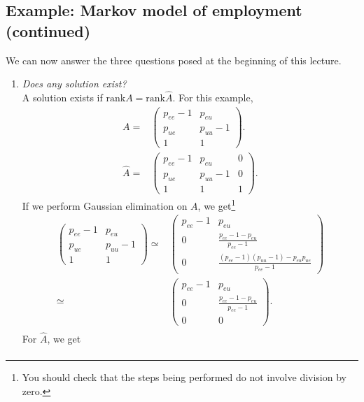 \documentclass[12pt,reqno]{amsart}
\newcommand{\rank}{\mathrm{rank}}
\theoremstyle{definition}
\begin{document}
\subsection*{Example: Markov model of employment (continued)}
We can now answer the three questions posed at the beginning of this
lecture. 
\renewcommand{\theenumi}{\arabic{enumi}}
\begin{enumerate}
\item \emph{Does any solution exist? } \\
  A solution exists if $\rank A = \rank \hat{A}$. For this example, 
  \begin{align*}
    A = & \begin{pmatrix} 
      p_{ee} - 1 & p_{eu}  \\ 
      p_{ue} & p_{uu}-1  \\ 
      1 & 1  \end{pmatrix}.  \\
    \hat{A} = & \begin{pmatrix} 
      p_{ee} - 1 & p_{eu} & 0 \\ 
      p_{ue} & p_{uu}-1 & 0 \\ 
      1 & 1 & 1 \end{pmatrix}. 
  \end{align*}
If we perform Gaussian elimination on $A$, we get\footnote{You should
  check that the steps being performed do not involve division by
  zero.}
\begin{align*}
  \begin{pmatrix} 
    p_{ee} - 1 & p_{eu}  \\ 
    p_{ue} & p_{uu}-1  \\ 
    1 & 1  \end{pmatrix} \simeq & 
  \begin{pmatrix} 
    p_{ee} - 1 & p_{eu}  \\ 
    0 & \frac{p_{ee}- 1 - p_{eu}}{p_{ee}-1}  \\
    0 & \frac{(p_{ee}-1) (p_{uu}- 1) - p_{eu} p_{ue}}{p_{ee}-1} 
  \end{pmatrix} \\
  \simeq &  
  \begin{pmatrix} 
    p_{ee} - 1 & p_{eu}  \\ 
    0 & \frac{p_{ee}- 1 - p_{eu}}{p_{ee}-1}  \\
    0 & 0 \end{pmatrix}. \\
\end{align*}
For $\hat{A}$, we get
\begin{align*}

\end{align*}
\end{enumerate}
\end{document}
